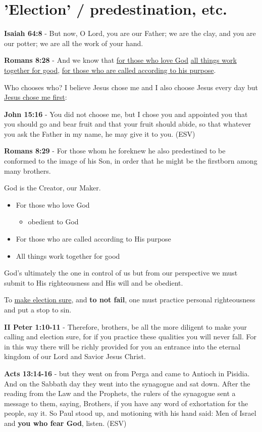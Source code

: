 \documentclass[11pt]{article}
\begin{document}
\section{'Election' / predestination, etc.}
\label{sec:org5445add}
\textbf{Isaiah 64:8} - But now, O Lord, you are our Father; we are the clay, and you are our potter; we are all the work of your hand.

\textbf{Romans 8:28} - And we know that \uline{for those who love God} \uline{all things work together for good}, \uline{for those who are called according to his purpose}.

Who chooses who? I believe Jesus chose me and I also choose Jesus every day but \uline{Jesus chose me first}:

\textbf{John 15:16} - You did not choose me, but I chose you and appointed you that you should go and bear fruit and that your fruit should abide, so that whatever you ask the Father in my name, he may give it to you. (ESV)

\textbf{Romans 8:29} - For those whom he foreknew he also predestined to be conformed to the image of his Son, in order that he might be the firstborn among many brothers.

God is the Creator, our Maker.

\begin{itemize}
\item For those who love God
\begin{itemize}
\item obedient to God
\end{itemize}
\item For those who are called according to His purpose
\item All things work together for good
\end{itemize}

God's ultimately the one in control of us but from our perspective we must submit to His righteousness and His will and be obedient.

To \uline{make election sure}, and \textbf{to not fail}, one must practice personal righteousness and put a stop to sin.

\textbf{II Peter 1:10-11} - Therefore, brothers, be all the more diligent to make your calling and election sure, for if you practice these qualities you will never fall. For in this way there will be richly provided for you an entrance into the eternal kingdom of our Lord and Savior Jesus Christ.

\textbf{Acts 13:14-16} - but they went on from Perga and came to Antioch in Pisidia.  And on the Sabbath day they went into the synagogue and sat down.  After the reading from the Law and the Prophets, the rulers of the synagogue sent a message to them, saying, Brothers, if you have any word of exhortation for the people, say it.  So Paul stood up, and motioning with his hand said: Men of Israel and \textbf{you who fear God}, listen.  (ESV)
\end{document}
